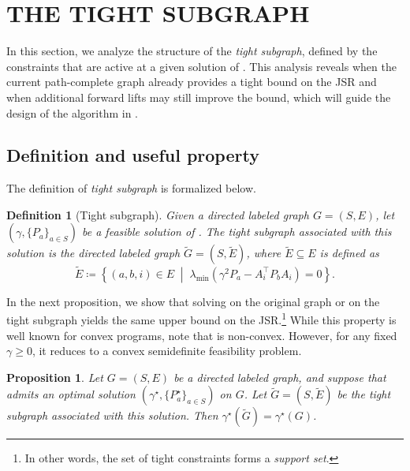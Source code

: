 \documentclass[letterpaper, 10 pt, conference]{ieeeconf}  %
\newtheorem{proposition}{Proposition}
\newtheorem{definition}{Definition}
\newif\ifextended
\begin{document}
\section{THE TIGHT SUBGRAPH}\label{sec:tight}
In this section, we analyze the structure of the \emph{tight subgraph}, defined by the constraints that are active at a given solution of . This analysis reveals when the current path-complete graph already provides a tight bound on the JSR and when additional forward lifts may still improve the bound, which will guide the design of the algorithm in .
\subsection{Definition and useful property}

The definition of \emph{tight subgraph} is formalized below.

\begin{definition}[Tight subgraph]\label{def:tight_subgraph}
Given a directed labeled graph $G=(S,E)$, let $(\gamma,\{P_a\}_{a\in S})$ be a feasible solution of .  
The \emph{tight subgraph} associated with this solution is the directed labeled graph $\tilde G=(S,\tilde E)$, where $\tilde E \subseteq E$ is defined as
\begin{equation*}
\tilde E
\coloneqq
\left\{
(a,b,i)\in E \;\middle|\;
\lambda_{\min}\!\left(\gamma^2 P_a - A_i^\top P_b A_i\right)=0
\right\}.
\end{equation*}
\smallskip
\end{definition}

In the next proposition, we show that solving  on the original graph or on the tight subgraph yields the same upper bound on the JSR.\footnote{In other words, the set of tight constraints forms a
\emph{support set}.} While this property is well known for convex programs, note that  is non-convex. However, for any fixed $\gamma \ge 0$, it reduces to a convex semidefinite feasibility problem.
\begin{proposition}
\label{prop:opt_tight}
Let $G=(S,E)$ be a directed labeled graph, and suppose that  admits an optimal solution $(\gamma^\star ,\{P_a^\star \}_{a\in S})$ on $G$. Let $\tilde G=(S,\tilde E)$ be the tight subgraph associated with this solution.
Then $\gamma^\star (\tilde G) = \gamma^\star (G)$.
\end{proposition}
\ifextended
\begin{proof}
The proof is given in Appendix~\ref{appendix:proof_equality_tight}.
\end{proof}
\fi
\end{document}
